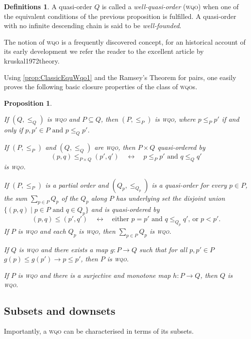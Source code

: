 \documentclass{article}%
\newcommand\textcite{}
\theoremstyle{plain}
\newtheorem{proposition}[theorem]{Proposition}
\theoremstyle{definition}
\newtheorem{definition}[theorem]{Definition}
\newtheorem{definition}[theorem]{Notation}
\newtheorem{definition}[theorem]{Notations}
\newtheorem{definition}[theorem]{Definitions}
\theoremstyle{remark}
\newcommand{\wqo}{\textsc{wqo}}
\newcommand{\SSI}{\quad\longleftrightarrow\quad} %
\begin{document}
\begin{definition}
A quasi-order $Q$ is called a \emph{well-quasi-order} (\wqo{}) when one of the equivalent conditions of the previous proposition is fulfilled. A quasi-order with no infinite descending chain is said to be \emph{well-founded}.
\end{definition}

The notion of \wqo{} is a frequently discovered concept, for an historical account of its early development we refer the reader to the excellent article by \textcite{kruskal1972theory}.

Using \cref{prop:ClassicEquWqo1} and the Ramsey's Theorem for pairs, one easily proves the following basic closure properties of the class of \wqo{}s.

\begin{proposition}\hfill \label{prop:ClosPropWQO}
\begin{enumThm}
\item If $(Q,\leq_{Q})$ is \wqo{} and $P\subseteq Q$, then $(P,\leq_{P})$ is \wqo{}, where $p\leq_{P} p'$ if and only if $p,p'\in P \text{ and }p\leq_{Q}p'$.
\item If $(P,\leq_{P})$ and $(Q,\leq_{Q})$ are \wqo{}, then $P\times Q$ quasi-ordered by 
\[
(p,q)\leq_{P\times Q} (p',q') \SSI p\leq_{P} p' \text{ and } q\leq_{Q} q'
\]
is \wqo{}.
\item If $(P,\leq_{P})$ is a \emph{partial order} and $(Q_{p},\leq_{Q_{p}})$ is a quasi-order for every $p\in P$, the sum $\sum_{p\in P}Q_{p}$ of the $Q_{p}$ along $P$ has underlying set the disjoint union $\{(p,q)\mid p\in P \text{ and }q\in Q_{p}\}$ and is quasi-ordered by 
\[
(p,q)\leq (p',q') \SSI \text{either } p=p' \text{ and } q\leq_{Q_{p}}q' \text{, or }
p<p'.
\]
If $P$ is \wqo{} and each $Q_{p}$ is \wqo{}, then $\sum_{p\in P}Q_{p}$ is \wqo{}.
\item If $Q$ is \wqo{} and there exists a map $g:P\to Q$ such that for all $p,p'\in P$ $g(p)\leq g(p') \to p\leq p'$, then $P$ is \wqo{}.
\item If $P$ is \wqo{} and there is a surjective and monotone map $h:P\to Q$, then $Q$ is \wqo{}.
\end{enumThm}
\end{proposition}

\subsection{Subsets and downsets}

Importantly, a \wqo{} can be characterised in terms of its subsets.
\end{document}
